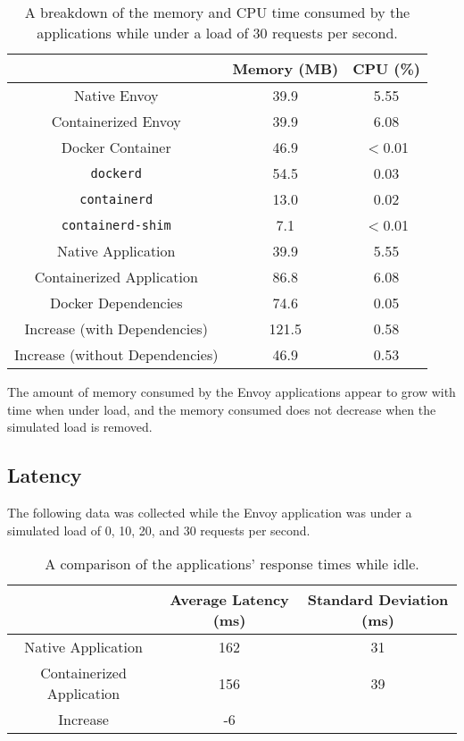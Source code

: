 \documentclass{article}
\begin{document}
\begin{table}[H]
\begin{tabular}{ |c|c|c| }
 \hline
   & Memory (MB) & CPU (\%) \\ 
 \hline
 Native Envoy & 39.9 & 5.55 \\
 \hline
 Containerized Envoy & 39.9 & 6.08 \\
 \hline
 Docker Container & 46.9 & $<$0.01 \\
 \hline
 \texttt{dockerd} & 54.5 & 0.03 \\
 \hline
 \texttt{containerd} & 13.0 & 0.02 \\
 \hline
 \texttt{containerd-shim} & 7.1 & $<$0.01 \\
 \hline\hline
 Native Application & 39.9 & 5.55 \\
 \hline
 Containerized Application & 86.8 & 6.08 \\
 \hline
 Docker Dependencies & 74.6 & 0.05 \\
 \hline\hline
 Increase (with Dependencies) & 121.5 & 0.58 \\
 \hline
 Increase (without Dependencies) & 46.9 & 0.53 \\
 \hline
\end{tabular}
\caption{A breakdown of the memory and CPU time consumed by the applications while under a load of 30 requests per second.}
\label{consumption-breakdown-under-load-30}
\end{table}

The amount of memory consumed by the Envoy applications appear to grow with time when under load, and the memory consumed does not decrease when the simulated load is removed.

\subsection{Latency}
The following data was collected while the Envoy application was under a simulated load of 0, 10, 20, and 30 requests per second.

\begin{table}[H]
\begin{tabular}{ |c|c|c| }
 \hline
 & Average Latency (ms) & Standard Deviation (ms) \\
 \hline
 Native Application & 162 & 31 \\
 \hline
 Containerized Application & 156 & 39 \\
 \hline\hline
 Increase & -6 & \\
 \hline
\end{tabular}
\caption{A comparison of the applications' response times while idle.}
\label{idle-latency}
\end{table}
\end{document}
